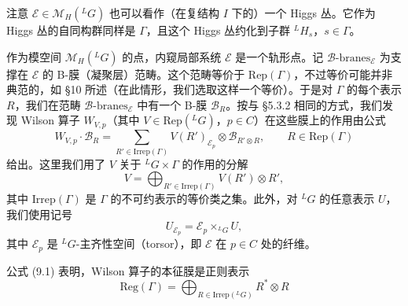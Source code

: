 注意 $\mathcal{E}\in\mathcal{M}_H({}^{L}G)$ 也可以看作（在复结构 $I$ 下的）一个 Higgs 丛。它作为 Higgs 丛的自同构群同样是 $\Gamma$，且这个 Higgs 丛约化到子群 ${}^{L}H_s$，$s\in\Gamma$。

作为模空间 $\mathcal{M}_H({}^{L}G)$ 的点，内窥局部系统 $\mathcal{E}$ 是一个轨形点。记 $\mathcal{B}\text{-branes}_{\mathcal{E}}$ 为支撑在 $\mathcal{E}$ 的 B-膜（凝聚层）范畴。这个范畴等价于 $\mathrm{Rep}(\Gamma)$，不过等价可能并非典范的，如 §10 所述（在此情形，我们选取这样一个等价）。于是对 $\Gamma$ 的每个表示 $R$，我们在范畴 $\mathcal{B}\text{-branes}_{\mathcal{E}}$ 中有一个 B-膜 $\mathcal{B}_R$。按与 §5.3.2 相同的方式，我们发现 Wilson 算子 $W_{V,p}$（其中 $V\in\mathrm{Rep}({}^{L}G)$，$p\in C$）在这些膜上的作用由公式
\begin{equation}\tag{9.1}
W_{V,p}\cdot\mathcal{B}_R = \sum_{R'\in\mathrm{Irrep}(\Gamma)}V(R')_{\mathcal{E}_p}\otimes\mathcal{B}_{R'\otimes R},
\qquad R\in\mathrm{Rep}(\Gamma)
\end{equation}
给出。这里我们用了 $V$ 关于 ${}^{L}G\times\Gamma$ 的作用的分解
\begin{equation}\tag{9.2}
V = \bigoplus_{R'\in\mathrm{Irrep}(\Gamma)}V(R')\otimes R',
\end{equation}
其中 $\mathrm{Irrep}(\Gamma)$ 是 $\Gamma$ 的不可约表示的等价类之集。此外，对 ${}^{L}G$ 的任意表示 $U$，我们使用记号
\[
U_{\mathcal{E}_p} = \mathcal{E}_p\times_{{}^{L}G}U,
\]
其中 $\mathcal{E}_p$ 是 ${}^{L}G$-主齐性空间（torsor），即 $\mathcal{E}$ 在 $p\in C$ 处的纤维。

公式 (9.1) 表明，Wilson 算子的本征膜是正则表示
\[
\mathrm{Reg}(\Gamma) = \bigoplus_{R\in\mathrm{Irrep}({}^{L}G)}R^*\otimes R
\]


